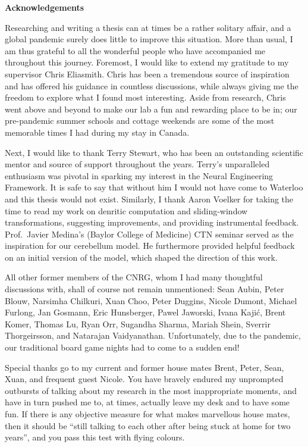 \begin{center}\textbf{Acknowledgements}\end{center}

Researching and writing a thesis can at times be a rather solitary affair, and a global pandemic surely does little to improve this situation.
More than usual, I am thus grateful to all the wonderful people who have accompanied me throughout this journey.
Foremost, I would like to extend my gratitude to my supervisor Chris Eliasmith.
Chris has been a tremendous source of inspiration and has offered his guidance in countless discussions, while always giving me the freedom to explore what I found most interesting.
Aside from research, Chris went above and beyond to make our lab a fun and rewarding place to be in; our pre-pandemic summer schools and cottage weekends are some of the most memorable times I had during my stay in Canada.

Next, I would like to thank Terry Stewart, who has been an outstanding scientific mentor and source of support throughout the years.
Terry's unparalleled enthusiasm was pivotal in sparking my interest in the Neural Engineering Framework.
It is safe to say that without him I would not have come to Waterloo and this thesis would not exist.
Similarly, I thank Aaron Voelker for taking the time to read my work on denritic computation and sliding-window transformations, suggesting improvements, and providing instrumental feedback.
Prof.~Javier Medina's (Baylor College of Medicine) CTN seminar served as the inspiration for our cerebellum model.
He furthermore provided helpful feedback on an initial version of the model, which shaped the direction of this work.

All other former members of the CNRG, whom I had many thoughtful discussions with, shall of course not remain unmentioned: Sean Aubin, Peter Blouw, Narsimha Chilkuri, Xuan Choo, Peter Duggins, Nicole Dumont, Michael Furlong, Jan Gosmann, Eric Hunsberger, Pawel Jaworski, Ivana Kajić, Brent Komer, Thomas Lu, Ryan Orr, Sugandha Sharma, Mariah Shein, Sverrir Thorgeirsson, and Natarajan Vaidyanathan.
Unfortunately, due to the pandemic, our traditional board game nights had to come to a sudden end!

Special thanks go to my current and former house mates Brent, Peter, Sean, Xuan, and frequent guest Nicole.
You have bravely endured my unprompted outbursts of talking about my research in the most inappropriate moments, and have in turn pushed me to, at times, actually leave my desk and to have some fun.
If there is any objective measure for what makes marvellous house mates, then it should be \enquote{still talking to each other after being stuck at home for two years}, and you pass this test with flying colours.

